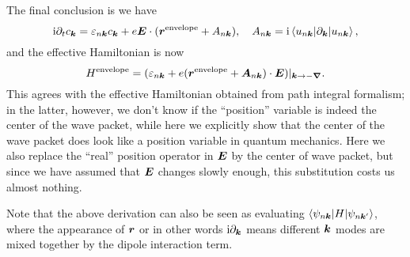 \documentclass[hyperref, a4paper]{article}
\newcommand*{\ii}{\mathrm{i}}
\begin{document}
The final conclusion is we have 
\begin{equation}
    \ii \partial_t c_{\vb*{k}}
    = \varepsilon_{n \vb*{k}} c_{\vb*{k}}
    + e \vb*{E} \cdot (\vb*{r}^{\text{envelope}} + A_{n \vb*{k}}), \quad 
    A_{n \vb*{k}} = \ii \mel**{u_{n \vb*{k}}}{\partial_{\vb*{k}}}{u_{n \vb*{k}}},
\end{equation}
and the effective Hamiltonian is now 
\begin{equation}
    H^{\text{envelope}} = (\varepsilon_{n \vb*{k}} 
    + e (\vb*{r}^{\text{envelope}} + \vb*{A}_{n \vb*{k}}) \cdot \vb*{E})|_{\vb*{k} \to - \grad}.
\end{equation}
This agrees with the effective Hamiltonian obtained 
from path integral formalism; 
in the latter, however, we don't know if the ``position'' variable 
is indeed the center of the wave packet, 
while here we explicitly show that the center of the wave packet 
does look like a position variable in quantum mechanics.
Here we also replace the ``real'' position operator in $\vb*{E}$ by the center of wave packet, 
but since we have assumed that $\vb*{E}$ changes slowly enough,
this substitution costs us almost nothing.

Note that the above derivation can also be seen as evaluating $\mel**{\psi_{n \vb*{k}}}{H}{\psi_{n \vb*{k}'}}$,
where the appearance of $\vb*{r}$ or in other words $\ii \partial_{\vb*{k}}$
means different $\vb*{k}$ modes are mixed together by the dipole interaction term. 
\end{document}
